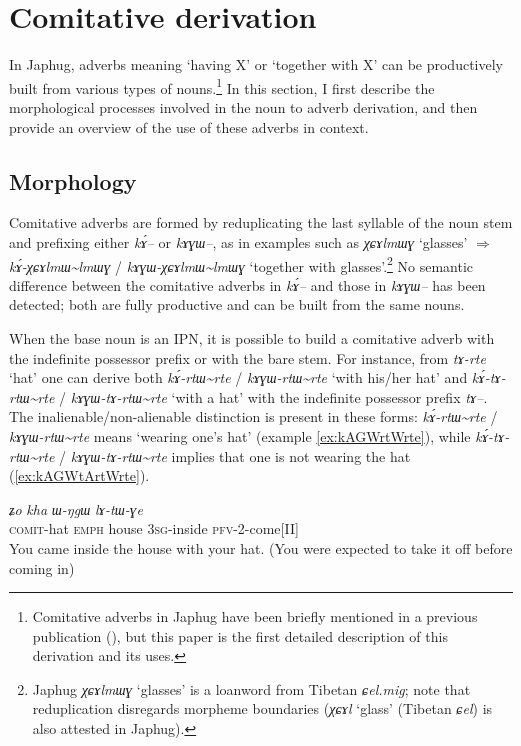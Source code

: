 \documentclass[oldfontcommands,oneside,a4paper,11pt]{article}
\newcommand{\ipa}[1]{{\phon\textit{#1}}} %
\newcommand{\tld}{\textasciitilde{}}
\begin{document}
 
 \section{Comitative derivation} 
In Japhug, adverbs meaning `having X' or `together with X' can be productively built from various types of nouns.\footnote{Comitative adverbs in Japhug have been briefly mentioned in a previous publication (\citealt[51]{jacques08}), but this paper is the first detailed description of this derivation and its uses.} In this section, I first describe the morphological processes involved in the noun to adverb derivation, and then provide an overview of the use of these adverbs in context.

\subsection{Morphology}
Comitative adverbs are formed by reduplicating the last syllable of the noun stem and prefixing either \ipa{kɤ́--} or \ipa{kɤɣɯ--}, as in examples such as \ipa{χɕɤlmɯɣ} `glasses' $\Rightarrow$ \ipa{kɤ́-χɕɤlmɯ\tld{}lmɯɣ} / \ipa{kɤɣɯ-χɕɤlmɯ\tld{}lmɯɣ} `together with glasses'.\footnote{Japhug \ipa{χɕɤlmɯɣ} `glasses' is a loanword from Tibetan \ipa{ɕel.mig}; note that reduplication disregards morpheme boundaries (\ipa{χɕɤl} `glass' (Tibetan \ipa{ɕel}) is also attested in Japhug). } No semantic difference between the comitative adverbs in \ipa{kɤ́--} and those in \ipa{kɤɣɯ--} has been detected; both are fully productive and can be built from the same nouns.

When the base noun is an IPN, it is possible to build a comitative adverb with the indefinite possessor prefix or with the bare stem. For instance, from \ipa{tɤ-rte} `hat' one can derive both \ipa{kɤ́-rtɯ\tld{}rte} / \ipa{kɤɣɯ-rtɯ\tld{}rte} `with his/her hat' and \ipa{kɤ́-tɤ-rtɯ\tld{}rte} /  \ipa{kɤɣɯ-tɤ-rtɯ\tld{}rte} `with a hat' with the indefinite possessor prefix \ipa{tɤ--}. The inalienable/non-alienable distinction is present in these forms: \ipa{kɤ́-rtɯ\tld{}rte} / \ipa{kɤɣɯ-rtɯ\tld{}rte} means `wearing one's hat' (example \ref{ex:kAGWrtWrte}), while \ipa{kɤ́-tɤ-rtɯ\tld{}rte} /  \ipa{kɤɣɯ-tɤ-rtɯ\tld{}rte} implies that one is not wearing the hat (\ref{ex:kAGWtArtWrte}).



\begin{exe}
\ex \label{ex:kAGWrtWrte}
\gll \ipa{kɤɣɯ-rtɯ\tld{}rte} 	\ipa{ʑo} 	\ipa{kha} 	\ipa{ɯ-ŋgɯ} 	\ipa{lɤ-tɯ-ɣe} 	\\
\textsc{comit}-hat \textsc{emph} house \textsc{3sg}-inside \textsc{pfv}-2-come[II] \\
\glt You came inside the house with your hat. (You were expected to take it off before coming in)
\end{exe}
\end{document}
